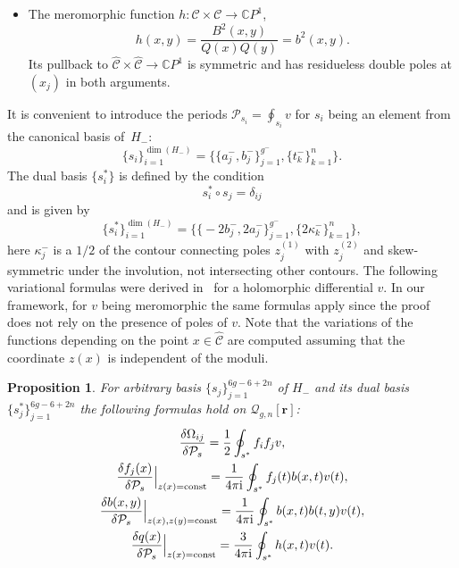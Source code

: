 \documentclass[pdftex]{sigma}
\numberwithin{equation}{section}
\newtheorem{Proposition}[Theorem]{Proposition}
\theoremstyle{definition}
\newcommand{\CC}{\mathbb{C}}
\begin{document}
\begin{itemize}
\item The meromorphic function $h\colon {\mathcal{C}} \times {\mathcal{C}} \xrightarrow{} \CC P^1 $,
\begin{equation*}%
h(x,y)=\frac{B^2(x,y)}{Q(x)Q(y)}=b^2(x,y).
\end{equation*}
Its pullback to $\hat{\mathcal{C}} \times \hat{\mathcal{C}}\xrightarrow{} \CC P^1$ is symmetric and has residueless double poles at $(x_j)$ in both arguments.
\end{itemize}

It is convenient to introduce the periods $\mathcal{P}_{s_i}=\oint_{s_i}v$ for $s_i$ being an element from the canonical basis of~$H_{-}$:
\begin{equation*}%
\{s_i\}^{\dim (H_-)}_{i=1}= \big\{\big\{a^-_j, b^-_j \big\}^{g^-}_{j=1}, \big\{t^-_k \big\}^{n}_{k=1} \big\}.
\end{equation*}
The dual basis $\{s^*_i\}$ is defined by the condition
\begin{equation*}%
s^*_i \circ s_j = \delta_{ij}
\end{equation*}
and is given by
\begin{equation*}%
\{s^*_i\}^{\dim (H_-)}_{i=1}= \big\{\bigl\{-2b^-_j, 2a^-_j \bigr\}^{g^-}_{j=1}, \big\{2\kappa^-_k \big\}^{n}_{k=1} \big\},
\end{equation*}
here $\kappa^-_j$ is a $1/2$ of the contour connecting poles $z^{(1)}_j$ with $z^{(2)}_j$ and skew-symmetric under the involution, not intersecting other contours.
The following variational formulas were derived in~\cite{Bertola_2017} for a holomorphic differential $v$. In our framework, for $v$ being meromorphic the same formulas apply since the proof does not rely on the presence of poles of $v$. Note that the variations of the functions depending on the point $x \in \hat{\mathcal{C}}$ are computed assuming that the coordinate $z(x)$ is independent of the moduli.

\begin{Proposition}
For arbitrary basis $\{s_j\}^{6g-6+2n}_{j=1}$ of $H_-$ and its dual basis $\{ s^{*}_{j} \}^{6g-6+2n}_{j=1}$ the following formulas hold on $\mathcal{Q}_{g,n}[\mathbf{r}]$:
\begin{gather}\label{51}\frac{\delta \Omega_{ij}}{\delta \mathcal{P}_{s}}=\frac{1}{2}\oint_{s^*}{f}_i {f}_j v,\\
\label{52}\frac{\delta f_j(x)} {\delta \mathcal{P}_s}\Big|_{z(x)={\rm const}}=\frac{1}{4 \pi {\rm i}}\oint_{s^*}{f}_j(t){b}(x,t)v(t),\\
\label{53}\frac{\delta b(x,y)}{\delta \mathcal{P}_s}\Big|_{z(x),z(y)={\rm const}}=\frac{1}{4 \pi {\rm i}}\oint_{s^*}{b}(x,t){b}(t,y)v(t),\\
\label{54}\frac{\delta q(x)}{\delta \mathcal{P}_s}\Big|_{z(x)={\rm const}}=\frac{3}{4 \pi {\rm i}}\oint_{s^*}{h}(x,t)v(t).\end{gather}
\end{Proposition}
\end{document}
